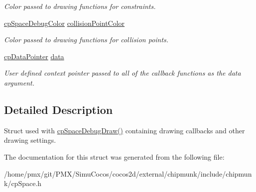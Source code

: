 \begin{DoxyCompactItemize}
\begin{DoxyCompactList}\small\item\em Color passed to drawing functions for constraints. \end{DoxyCompactList}\item 
\mbox{\label{structcpSpaceDebugDrawOptions_aaa3ebd801675e71f6ce0954514d3e9aa}} 
\hyperlink{structcpSpaceDebugColor}{cp\+Space\+Debug\+Color} \hyperlink{structcpSpaceDebugDrawOptions_aaa3ebd801675e71f6ce0954514d3e9aa}{collision\+Point\+Color}
\begin{DoxyCompactList}\small\item\em Color passed to drawing functions for collision points. \end{DoxyCompactList}\item 
\mbox{\label{structcpSpaceDebugDrawOptions_a68c76e73a9a75b589bb1d26925fcc3e4}} 
\hyperlink{group__basicTypes_ga2ac2c3c31e21893941f9e4f8ee279447}{cp\+Data\+Pointer} \hyperlink{structcpSpaceDebugDrawOptions_a68c76e73a9a75b589bb1d26925fcc3e4}{data}
\begin{DoxyCompactList}\small\item\em User defined context pointer passed to all of the callback functions as the \textquotesingle{}data\textquotesingle{} argument. \end{DoxyCompactList}\end{DoxyCompactItemize}


\subsection{Detailed Description}
Struct used with \hyperlink{group__cpSpace_ga02e8a34681aff3f29bd976e830f3b6da}{cp\+Space\+Debug\+Draw()} containing drawing callbacks and other drawing settings. 

The documentation for this struct was generated from the following file\+:\begin{DoxyCompactItemize}
\item 
/home/pmx/git/\+P\+M\+X/\+Simu\+Cocos/cocos2d/external/chipmunk/include/chipmunk/cp\+Space.\+h\end{DoxyCompactItemize}
